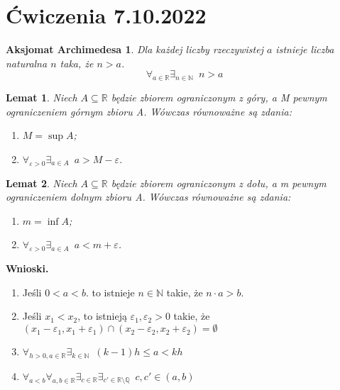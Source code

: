 \documentclass{article}
\newcommand{\R}{\mathbb{R}}
\newcommand{\N}{\mathbb{N}}
\newcommand{\Q}{\mathbb{Q}}
\newtheorem*{arch}{Aksjomat Archimedesa}
\newtheorem{lemma}{Lemat}
\begin{document}
%

                                            \section{Ćwiczenia 7.10.2022}

\begin{arch} %
Dla każdej liczby rzeczywistej $a$ istnieje liczba naturalna $n$ taka, że $n>a$.
    \begin{equation*}
        \forall_{a\in\R}\exists_{n\in\N}\enspace n>a
    \end{equation*}
\end{arch}

\begin{lemma} %
Niech $A\subseteq\R$ będzie zbiorem ograniczonym z góry, a M pewnym ograniczeniem górnym zbioru A.
Wówczas równoważne są zdania:
    \begin{enumerate}[label=(\roman*)]
        \item $M=\sup{A}$;
        \item $\forall_{\varepsilon>0}\exists_{a\in A}\enspace a>M-\varepsilon$.
    \end{enumerate}
\end{lemma}

\begin{lemma} %
Niech $A\subseteq\R$ będzie zbiorem ograniczonym z dołu, a m pewnym ograniczeniem dolnym zbioru A.
Wówczas równoważne są zdania:
    \begin{enumerate}[label=(\roman*)]
        \item $m=\inf{A}$;
        \item $\forall_{\varepsilon>0}\exists_{a\in A}\enspace a<m+\varepsilon$.
    \end{enumerate}
\end{lemma}

\noindent \textbf{Wnioski.}
    \begin{enumerate}[label=(\Roman*)]
        \item Jeśli $0<a<b$. to istnieje $n\in\N$ takie, że $n\cdot a>b$.
        \item Jeśli $x_1<x_2$, to istnieją $\varepsilon_1,\varepsilon_2>0$ takie, że $(x_1-\varepsilon_1,x_1+\varepsilon_1)\cap(x_2-\varepsilon_2,x_2+\varepsilon_2)=\emptyset$
        \item $\forall_{h>0,a\in\R}\exists_{k\in\N} \enspace (k-1)h\le a<kh$
        \item $\forall_{a<b}\forall_{a,b\in\R}\exists_{c\in\R}\exists_{c'\in\R\setminus\Q} \enspace c,c'\in(a,b)$
    \end{enumerate}
\end{document}
